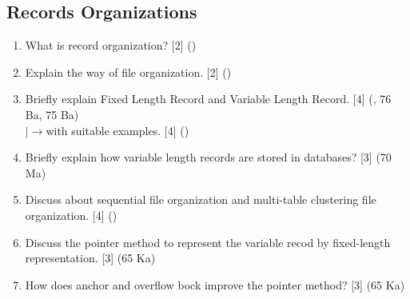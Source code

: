 \documentclass[12pt]{article}
\newcommand{\lb}{\\$\left|\rightarrow\right.$}
\begin{document}
    \subsection{Records Organizations}
		\begin{enumerate}[noitemsep, topsep=0pt]
			\item What is record organization? \hfill [2] ()
			
			\item Explain the way of file organization. \hfill [2] ()
			
			\item Briefly explain Fixed Length Record and Variable Length Record. \hfill [4] (, 76 Ba, 75 Ba)
			\lb with suitable examples. \hfill [4] ()
			
			\item Briefly explain how variable length records are stored in databases? \hfill [3] (70 Ma)
			
			\item Discuss about sequential file organization and multi-table clustering file organization. \hfill [4] ()
			
			\item Discuss the pointer method to represent the variable recod by fixed-length representation. \hfill [3] (65 Ka)
			
			\item How does anchor and overflow bock improve the pointer method? \hfill [3] (65 Ka)
		\end{enumerate}		    
    
\end{document}
